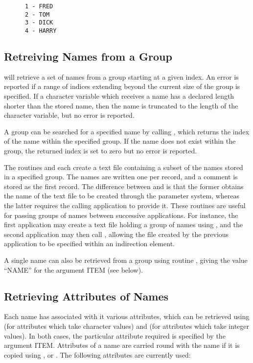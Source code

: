 \small
\begin{verbatim}
      1 - FRED
      2 - TOM
      3 - DICK
      4 - HARRY
\end{verbatim}
\normalsize

\subsection{Retreiving Names from a Group}
 will retrieve a set of names from a group starting at a given index. An
error is reported if a range of indices extending beyond the current size of
the group is specified. If a character variable which receives a name  has a
declared length shorter than the stored name, then the name is truncated to the
length of the character variable, but no error is reported.

A group can be searched for a specified name by calling , which
returns the index of the name within the specified group. If the name does
not exist within the group, the returned index is set to zero but no error is
reported.

The routines  and  
each create a text file containing a
subset of the names stored in a specified group. The names are written one per
record, and a comment is stored as the first record. The difference between
 and  is that the former 
obtains the name of the text file to
be created through the parameter system, whereas the latter requires the calling
application to provide it. These routines are useful for passing groups of names
between successive applications. For instance, the first application may create
a text file holding a group of names using , and the second application
may then call , allowing the file created by the previous application
to be specified within an indirection element.

A single name can also be retrieved from a group using routine ,
giving the value ``NAME'' for the argument ITEM (see below).

\subsection{Retrieving Attributes of Names}
Each name has associated with it various attributes, which can be retrieved
using  (for attributes which take character values) and 
(for attributes which take integer values). In both cases, the particular
attribute required is specified by the argument ITEM. Attributes of a name
are carried round with the name if it is copied using ,  or
. The following attributes are currently used:


